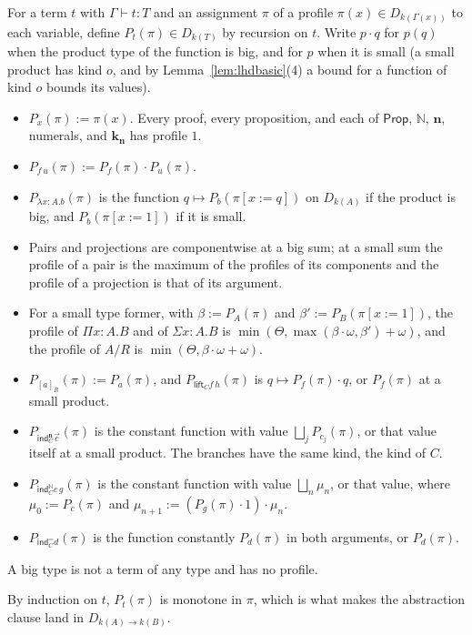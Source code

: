 \documentclass[10pt]{article}
\newcommand{\N}{\mathbb{N}}
\newcommand{\Prop}{\mathsf{Prop}}
\newcommand{\ind}{\mathsf{ind}}
\begin{document}
\begin{definition}\label{def:P}
For a term $t$ with $\Gamma\vdash t:T$ and an assignment $\pi$ of a
profile $\pi(x)\in D_{k(\Gamma(x))}$ to each variable, define
$P_t(\pi)\in D_{k(T)}$ by recursion on $t$. Write $p\cdot q$ for $p(q)$
when the product type of the function is big, and for $p$ when it is
small (a small product has kind $o$, and by
Lemma~\ref{lem:lhdbasic}(4) a bound for a function of kind $o$ bounds
its values).
\begin{itemize}
\item $P_x(\pi):=\pi(x)$. Every proof, every proposition, and each of
  $\Prop$, $\N$, $\mathbf n$, numerals, and $\mathbf k_{\mathbf n}$ has
  profile $1$.
\item $P_{f\,u}(\pi):=P_f(\pi)\cdot P_u(\pi)$.
\item $P_{\lambda x{:}A.b}(\pi)$ is the function
  $q\mapsto P_b(\pi[x{:=}q])$ on $D_{k(A)}$ if the product is big, and
  $P_b(\pi[x{:=}1])$ if it is small.
\item Pairs and projections are componentwise at a big sum; at a small
  sum the profile of a pair is the maximum of the profiles of its
  components and the profile of a projection is that of its argument.
\item For a small type former, with $\beta:=P_A(\pi)$ and
  $\beta':=P_B(\pi[x{:=}1])$, the profile of $\Pi x{:}A.B$ and of
  $\Sigma x{:}A.B$ is $\min(\Theta,\max(\beta\cdot\omega,\beta')+\omega)$,
  and the profile of $A/R$ is $\min(\Theta,\beta\cdot\omega+\omega)$.
\item $P_{[a]_R}(\pi):=P_a(\pi)$, and
  $P_{\mathsf{lift}_Cf\,h}(\pi)$ is $q\mapsto P_f(\pi)\cdot q$, or
  $P_f(\pi)$ at a small product.
\item $P_{\ind^{\mathbf n}_C\vec c}(\pi)$ is the constant function with
  value $\bigsqcup_jP_{c_j}(\pi)$, or that value itself at a small
  product. The branches have the same kind, the kind of $C$.
\item $P_{\ind^\N_Cc\,g}(\pi)$ is the constant function with value
  $\bigsqcup_n\mu_n$, or that value, where $\mu_0:=P_c(\pi)$ and
  $\mu_{n+1}:=(P_g(\pi)\cdot1)\cdot\mu_n$.
\item $P_{\ind^=_Cd}(\pi)$ is the function constantly $P_d(\pi)$ in both
  arguments, or $P_d(\pi)$.
\end{itemize}
A big type is not a term of any type and has no profile.
\end{definition}

By induction on $t$, $P_t(\pi)$ is monotone in $\pi$, which is what
makes the abstraction clause land in $D_{k(A)\to k(B)}$.
\end{document}
